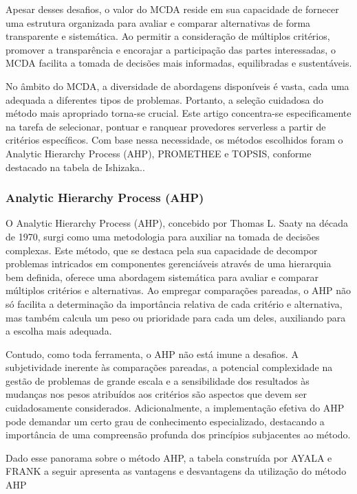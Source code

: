 \documentclass[12pt]{article}[abntex2]
\begin{document}
Apesar desses desafios, o valor do MCDA reside em sua capacidade de fornecer uma estrutura organizada para avaliar e comparar alternativas de forma transparente e sistemática. Ao permitir a consideração de múltiplos critérios, promover a transparência e encorajar a participação das partes interessadas, o MCDA facilita a tomada de decisões mais informadas, equilibradas e sustentáveis.

No âmbito do MCDA, a diversidade de abordagens disponíveis é vasta, cada uma adequada a diferentes tipos de problemas. Portanto, a seleção cuidadosa do método mais apropriado torna-se crucial. Este artigo concentra-se especificamente na tarefa de selecionar, pontuar e ranquear provedores serverless a partir de critérios específicos. Com base nessa necessidade, os métodos escolhidos foram o Analytic Hierarchy Process (AHP), PROMETHEE e TOPSIS, conforme destacado na tabela de Ishizaka.\cite{Multi_criteria_2013}.

\subsubsection{Analytic Hierarchy Process (AHP)}
O Analytic Hierarchy Process (AHP), concebido por Thomas L. Saaty na década de 1970, surgi como uma metodologia para auxiliar na tomada de decisões complexas. Este método, que se destaca pela sua capacidade de decompor problemas intricados em componentes gerenciáveis através de uma hierarquia bem definida, oferece uma abordagem sistemática para avaliar e comparar múltiplos critérios e alternativas. Ao empregar comparações pareadas, o AHP não só facilita a determinação da importância relativa de cada critério e alternativa, mas também calcula um peso ou prioridade para cada um deles, auxiliando para a escolha mais adequada.

Contudo, como toda ferramenta, o AHP não está imune a desafios. A subjetividade inerente às comparações pareadas, a potencial complexidade na gestão de problemas de grande escala e a sensibilidade dos resultados às mudanças nos pesos atribuídos aos critérios são aspectos que devem ser cuidadosamente considerados. Adicionalmente, a implementação efetiva do AHP pode demandar um certo grau de conhecimento especializado, destacando a importância de uma compreensão profunda dos princípios subjacentes ao método.

Dado esse panorama sobre o método AHP, a tabela construída por AYALA e FRANK \cite{ayala2013metodos} a seguir apresenta as vantagens e desvantagens da utilização do método AHP
\end{document}
